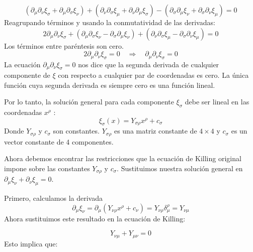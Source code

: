 \begin{equation}
\left(\partial_\mu \partial_\nu \xi_\sigma+\partial_\mu \partial_\sigma \xi_\nu\right)+\left(\partial_\nu \partial_\sigma \xi_\mu+\partial_\nu \partial_\mu \xi_\sigma\right)-\left(\partial_\sigma \partial_\mu \xi_\nu+\partial_\sigma \partial_\nu \xi_\mu\right)=0
\end{equation}
Reagrupando términos y usando la conmutatividad de las derivadas:
\begin{equation}
2 \partial_\mu \partial_\nu \xi_\sigma+\left(\partial_\mu \partial_\sigma \xi_\nu-\partial_\sigma \partial_\mu \xi_\nu\right)+\left(\partial_\nu \partial_\sigma \xi_\mu-\partial_\sigma \partial_\nu \xi_\mu\right)=0
\end{equation}
Los términos entre paréntesis son cero. 
\begin{equation}
2 \partial_\mu \partial_\nu \xi_\sigma=0 \quad \Longrightarrow \quad \partial_\mu \partial_\nu \xi_\sigma=0
\end{equation}
La ecuación $\partial_\mu \partial_\nu \xi_\sigma=0$ nos dice que la segunda derivada de cualquier componente de $\xi$ con respecto a cualquier par de coordenadas es cero. La única función cuya segunda derivada es siempre cero es una función lineal.

Por lo tanto, la solución general para cada componente $\xi_\sigma$ debe ser lineal en las coordenadas $x^\rho$ :
\begin{equation}
\xi_\sigma(x)=Y_{\sigma \rho} x^\rho+c_\sigma
\end{equation}
Donde $Y_{\sigma \rho}$ y $c_\sigma$ son constantes. $Y_{\sigma \rho}$ es una matriz constante de $4 \times 4$ y $c_\sigma$ es un vector constante de 4 componentes.

Ahora debemos encontrar las restricciones que la ecuación de Killing original impone sobre las constantes $Y_{\sigma \rho}$ y $c_\sigma$. Sustituimos nuestra solución general en $\partial_\mu \xi_\nu+\partial_\nu \xi_\mu=0$.

Primero, calculamos la derivada
\begin{equation}
\partial_\mu \xi_\nu=\partial_\mu\left(Y_{\nu \rho} x^\rho+c_\nu\right)=Y_{\nu \rho} \delta_\mu^\rho=Y_{\nu \mu}    
\end{equation}
Ahora sustituimos este resultado en la ecuación de Killing:

\begin{equation}
Y_{\nu \mu}+Y_{\mu \nu}=0
\end{equation}
Esto implica que:

